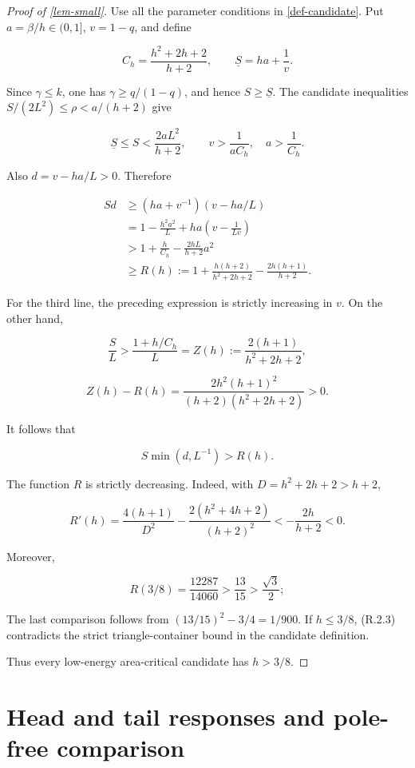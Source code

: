 \documentclass[11pt,a4paper]{article}
\theoremstyle{proofmanuscript}
\begin{document}
\begin{proof}[Proof of \ref{lem-small}]

Use all the parameter conditions in \ref{def-candidate}. Put \(a=\beta/h\in(0,1]\), \(v=1-q\), and define

\[
C_h=\frac{h^2+2h+2}{h+2},\qquad
\underline S=ha+\frac1v.
\]

Since \(\gamma\le k\), one has \(\gamma\ge q/(1-q)\), and hence \(S\ge\underline S\). The candidate inequalities \(S/(2L^2)\le\rho<a/(h+2)\) give

\[
\underline S\le S<\frac{2aL^2}{h+2},
\qquad v>\frac1{aC_h},\quad a>\frac1{C_h}.
\tag{R.2.1}
\]

Also \(d=v-ha/L>0\). Therefore

\[
\begin{aligned}
Sd&\ge(ha+v^{-1})(v-ha/L)\\
&=1-\frac{h^2a^2}{L}+ha\left(v-\frac1{Lv}\right)\\
&>1+\frac h{C_h}-\frac{2hL}{h+2}a^2\\
&\ge R(h):=1+\frac{h(h+2)}{h^2+2h+2}-\frac{2h(h+1)}{h+2}.
\end{aligned}\tag{R.2.2}
\]

For the third line, the preceding expression is strictly increasing in \(v\). On the other hand,

\[
\frac SL>\frac{1+h/C_h}{L}=
Z(h):=\frac{2(h+1)}{h^2+2h+2},
\]

\[
Z(h)-R(h)=\frac{2h^2(h+1)^2}{(h+2)(h^2+2h+2)}>0.
\]

It follows that

\[
S\min(d,L^{-1})>R(h).\tag{R.2.3}
\]

The function \(R\) is strictly decreasing. Indeed, with \(D=h^2+2h+2>h+2\),

\[
R'(h)=\frac{4(h+1)}{D^2}-\frac{2(h^2+4h+2)}{(h+2)^2}
< -\frac{2h}{h+2}<0.
\]

Moreover,

\[
R(3/8)=\frac{12287}{14060}>\frac{13}{15}>\frac{\sqrt3}{2};
\]

The last comparison follows from \((13/15)^2-3/4=1/900\). If \(h\le3/8\), (R.2.3) contradicts the strict triangle-container bound in the candidate definition.

Thus every low-energy area-critical candidate has \(h>3/8\).

\end{proof}


\section{Head and tail responses and pole-free comparison}
\end{document}
